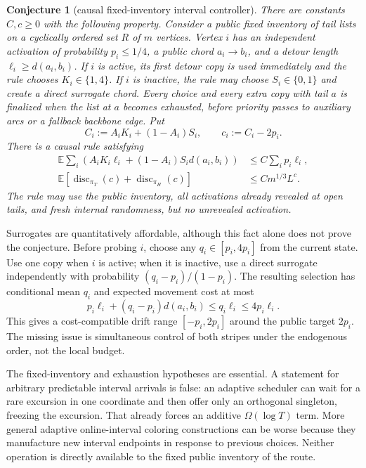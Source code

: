 \documentclass[11pt]{article}
\newtheorem{conjecture}[theorem]{Conjecture}
\theoremstyle{remark}
\newcommand{\E}{\mathbb E}
\newcommand{\disc}{\operatorname{disc}}
\begin{document}
\begin{conjecture}[causal fixed-inventory interval controller]
\label{conj:gateway}
There are constants $C,c\ge0$ with the following property.  Consider a
public fixed inventory of tail lists on a cyclically ordered set $R$ of
$m$ vertices.  Vertex $i$ has an independent activation of probability
$p_i\le1/4$, a public chord $a_i\to b_i$, and a detour length
$\ell_i\ge d(a_i,b_i)$.  If $i$ is active, its first detour copy is used
immediately and the rule chooses $K_i\in\{1,4\}$.  If $i$ is inactive, the
rule may choose $S_i\in\{0,1\}$ and create a direct surrogate chord.  Every
choice and every extra copy with tail $a$ is finalized when the list at $a$
becomes exhausted, before priority passes to auxiliary arcs or a fallback
backbone edge.  Put
\[
 C_i:=A_iK_i+(1-A_i)S_i,
 \qquad c_i:=C_i-2p_i.
\]
There is a causal rule satisfying
\begin{align}
 \E\sum_i\left(
     A_iK_i\ell_i+(1-A_i)S_i d(a_i,b_i)
   \right)
   &\le C\sum_i p_i\ell_i,
   \label{eq:gateway-cost}\\
 \E\left[\disc_{\pi_T}(c)+\disc_{\pi_H}(c)\right]
   &\le C m^{1/3}L^c.                              \label{eq:gateway-disc}
\end{align}
The rule may use the public inventory, all activations already revealed at
open tails, and fresh internal randomness, but no unrevealed activation.
\end{conjecture}

Surrogates are quantitatively affordable, although this fact alone does not
prove the conjecture.  Before probing $i$, choose any
$q_i\in[p_i,4p_i]$ from the current state.  Use one copy when $i$ is active;
when it is inactive, use a direct surrogate independently with probability
$(q_i-p_i)/(1-p_i)$.  The resulting selection has conditional mean $q_i$ and
expected movement cost at most
\[
 p_i\ell_i+(q_i-p_i)d(a_i,b_i)
 \le q_i\ell_i\le4p_i\ell_i.
\]
This gives a cost-compatible drift range $[-p_i,2p_i]$ around the public
target $2p_i$.  The missing issue is simultaneous control of both stripes
under the endogenous order, not the local budget.

The fixed-inventory and exhaustion hypotheses are essential.  A statement
for arbitrary predictable interval arrivals is false: an adaptive scheduler
can wait for a rare excursion in one coordinate and then offer only an
orthogonal singleton, freezing the excursion.  That already forces an
additive $\Omega(\log T)$ term.  More general adaptive online-interval
coloring constructions can be worse because they manufacture new interval
endpoints in response to previous choices.  Neither operation is directly
available to the fixed public inventory of the route.
\end{document}
